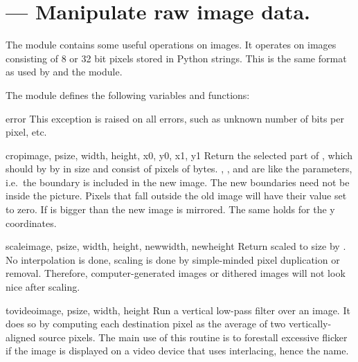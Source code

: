 \section{ ---
         Manipulate raw image data.}



The  module contains some useful operations on images.
It operates on images consisting of 8 or 32 bit pixels stored in
Python strings.  This is the same format as used by
 and the  module.

The module defines the following variables and functions:

\begin{excdesc}{error}
This exception is raised on all errors, such as unknown number of bits
per pixel, etc.
\end{excdesc}


\begin{funcdesc}{crop}{image, psize, width, height, x0, y0, x1, y1}
Return the selected part of , which should by
 by  in size and consist of pixels of
 bytes. , ,  and  are like
the  parameters, i.e.\ the boundary is
included in the new image.  The new boundaries need not be inside the
picture.  Pixels that fall outside the old image will have their value
set to zero.  If  is bigger than  the new image is
mirrored.  The same holds for the y coordinates.
\end{funcdesc}

\begin{funcdesc}{scale}{image, psize, width, height, newwidth, newheight}
Return  scaled to size  by .
No interpolation is done, scaling is done by simple-minded pixel
duplication or removal.  Therefore, computer-generated images or
dithered images will not look nice after scaling.
\end{funcdesc}

\begin{funcdesc}{tovideo}{image, psize, width, height}
Run a vertical low-pass filter over an image.  It does so by computing
each destination pixel as the average of two vertically-aligned source
pixels.  The main use of this routine is to forestall excessive
flicker if the image is displayed on a video device that uses
interlacing, hence the name.
\end{funcdesc}

